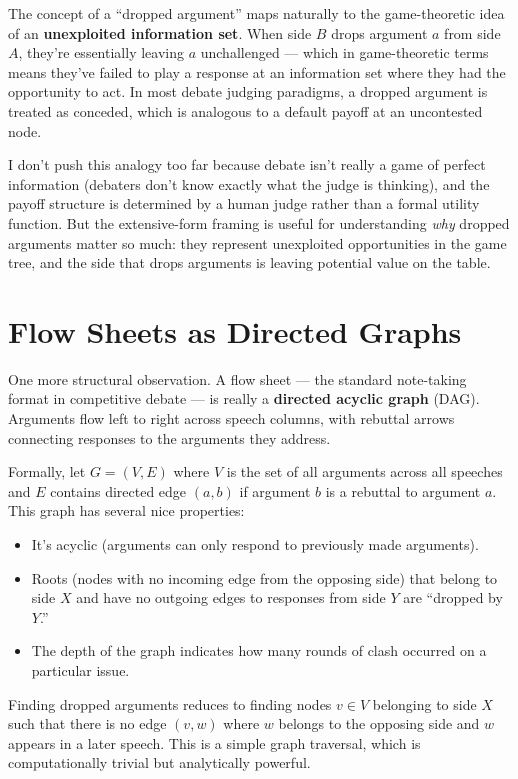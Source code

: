 \documentclass[11pt]{article}
\begin{document}
The concept of a ``dropped argument'' maps naturally to the game-theoretic idea of an \textbf{unexploited information set}. When side $B$ drops argument $a$ from side $A$, they're essentially leaving $a$ unchallenged --- which in game-theoretic terms means they've failed to play a response at an information set where they had the opportunity to act. In most debate judging paradigms, a dropped argument is treated as conceded, which is analogous to a default payoff at an uncontested node.

I don't push this analogy too far because debate isn't really a game of perfect information (debaters don't know exactly what the judge is thinking), and the payoff structure is determined by a human judge rather than a formal utility function. But the extensive-form framing is useful for understanding \textit{why} dropped arguments matter so much: they represent unexploited opportunities in the game tree, and the side that drops arguments is leaving potential value on the table.

\section{Flow Sheets as Directed Graphs}

One more structural observation. A flow sheet --- the standard note-taking format in competitive debate --- is really a \textbf{directed acyclic graph} (DAG). Arguments flow left to right across speech columns, with rebuttal arrows connecting responses to the arguments they address.

Formally, let $G = (V, E)$ where $V$ is the set of all arguments across all speeches and $E$ contains directed edge $(a, b)$ if argument $b$ is a rebuttal to argument $a$. This graph has several nice properties:

\begin{itemize}
    \item It's acyclic (arguments can only respond to previously made arguments).
    \item Roots (nodes with no incoming edge from the opposing side) that belong to side $X$ and have no outgoing edges to responses from side $Y$ are ``dropped by $Y$.''
    \item The depth of the graph indicates how many rounds of clash occurred on a particular issue.
\end{itemize}

Finding dropped arguments reduces to finding nodes $v \in V$ belonging to side $X$ such that there is no edge $(v, w)$ where $w$ belongs to the opposing side and $w$ appears in a later speech. This is a simple graph traversal, which is computationally trivial but analytically powerful.
\end{document}
